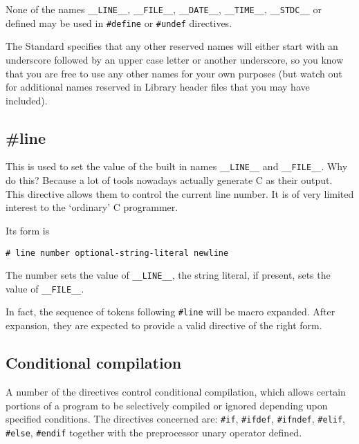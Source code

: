    None of the names \texttt{\_\_LINE\_\_}, \texttt{\_\_FILE\_\_},
    \texttt{\_\_DATE\_\_}, \texttt{\_\_TIME\_\_}, \texttt{\_\_STDC\_\_} or
    defined may be used in \texttt{\#define} or \texttt{\#undef}
    directives.


   The Standard specifies that any other reserved names will either start
    with an underscore followed by an upper case letter or another
    underscore, so you know that you are free to use any other names for
    your own purposes (but watch out for additional names reserved in
    Library header files that you may have included).


  

  \subsection{\#line}
   

   This is used to set the value of the built in names
    \texttt{\_\_LINE\_\_} and \texttt{\_\_FILE\_\_}. Why do this? Because
    a lot of tools nowadays actually generate C as their output. This
    directive allows them to control the current line number. It is of very
    limited interest to the `ordinary' C programmer.


   Its form is


   \begin{Verbatim}
# line number optional-string-literal newline
\end{Verbatim}

   The number sets the value of \texttt{\_\_LINE\_\_}, the string
    literal, if present, sets the value of \texttt{\_\_FILE\_\_}.


   In fact, the sequence of tokens following \texttt{\#line} will be
    macro expanded. After expansion, they are expected to provide a valid
    directive of the right form.


  

  \subsection{Conditional compilation}
   

   A number of the directives control conditional compilation, which
    allows certain portions of a program to be selectively compiled or
    ignored depending upon specified conditions. The directives concerned
    are: \texttt{\#if}, \texttt{\#ifdef}, \texttt{\#ifndef},
    \texttt{\#elif}, \texttt{\#else}, \texttt{\#endif} together
    with the preprocessor unary operator defined.


